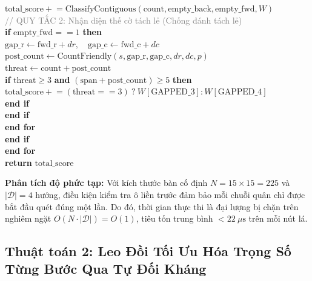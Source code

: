 \documentclass[11pt,a4paper]{article}
\begin{document}
\begin{tcolorbox}
\quad\quad\quad $\text{total\_score} \mathrel{+}= \text{ClassifyContiguous}(\text{count}, \text{empty\_back}, \text{empty\_fwd}, W)$\\
\quad\quad\quad \textcolor{gray}{// QUY TẮC 2: Nhận diện thế cờ tách lẻ (Chống đánh tách lẻ)}\\
\quad\quad\quad \textbf{if} $\text{empty\_fwd} == 1$ \textbf{then}\\
\quad\quad\quad\quad $\text{gap\_r} \leftarrow \text{fwd\_r} + dr, \quad \text{gap\_c} \leftarrow \text{fwd\_c} + dc$\\
\quad\quad\quad\quad $\text{post\_count} \leftarrow \text{CountFriendly}(s, \text{gap\_r}, \text{gap\_c}, dr, dc, p)$\\
\quad\quad\quad\quad $\text{threat} \leftarrow \text{count} + \text{post\_count}$\\
\quad\quad\quad\quad \textbf{if} $\text{threat} \ge 3$ \textbf{and} $(\text{span} + \text{post\_count}) \ge 5$ \textbf{then}\\
\quad\quad\quad\quad\quad $\text{total\_score} \mathrel{+}= (\text{threat} == 3) \ ? \ W[\text{GAPPED\_3}] : W[\text{GAPPED\_4}]$\\
\quad\quad\quad\quad \textbf{end if}\\
\quad\quad\quad \textbf{end if}\\
\quad\quad \textbf{end for}\\
\quad \textbf{end if}\\
\textbf{end for}\\
\textbf{return} $\text{total\_score}$
\end{tcolorbox}

\textbf{Phân tích độ phức tạp:} Với kích thước bàn cố định $N = 15 \times 15 = 225$ và $|\mathcal{D}| = 4$ hướng, điều kiện kiểm tra ô liền trước đảm bảo mỗi chuỗi quân chỉ được bắt đầu quét đúng một lần. Do đó, thời gian thực thi là đại lượng bị chặn trên nghiêm ngặt $O(N \cdot |\mathcal{D}|) = O(1)$, tiêu tốn trung bình $< 22\ \mu\text{s}$ trên mỗi nút lá.

\subsection{Thuật toán 2: Leo Đồi Tối Ưu Hóa Trọng Số Từng Bước Qua Tự Đối Kháng}
\end{document}
